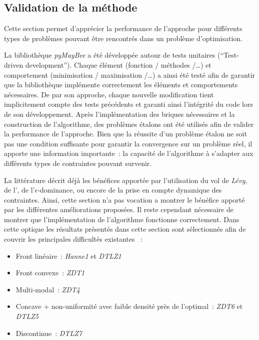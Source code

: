 \subsection{Validation de la méthode} %
\label{sub:validation_de_la_methode}
Cette section permet d’apprécier la performance de l’approche pour différents types
de problèmes pouvant être rencontrés dans un problème d’optimisation.

La bibliothèque \textit{pyMayBee} a été développée autour de tests unitaires (\enquote
{Test-driven development}). Chaque élément (fonction / méthodes /\dots) et comportement
(minimisation / maximisation /\dots) a ainsi été testé afin de garantir que la
bibliothèque implémente correctement les éléments et comportements nécessaires. De par
son approche, chaque nouvelle modification tient implicitement compte des tests précédents
et garanti ainsi l’intégrité du code lors de son développement. Après l’implémentation
des briques nécessaires et la construction de l’algorithme, des problèmes étalons ont été
utilisés afin de valider la performance de l’approche. Bien que la réussite d’un problème
étalon ne soit pas une condition suffisante pour garantir la convergence sur un problème
réel, il apporte une information importante~: la capacité de l’algorithme à s’adapter aux
différents types de contraintes pouvant survenir.

La littérature décrit déjà les bénéfices apportée par l’utilisation du vol de
\textit{Lévy}, de l’, de l’$\epsilon$-dominance, ou encore de la prise en compte
dynamique des contraintes. Ainsi, cette section n’a pas vocation a montrer le bénéfice
apporté par les différentes améliorations proposées. Il reste cependant nécessaire de
montrer que l’implémentation de l’algorithme  fonctionne correctement. Dans cette
optique les résultats présentés dans cette section sont sélectionnés afin de couvrir les
principales difficultés existantes \parencite{Collette2002,Deb2002825}~:
\begin{itemize}
    \item Front linéaire~: \textit{Hanne1} et \textit{DTLZ1}
    \item Front convexe~: \textit{ZDT1}
    \item Multi-modal~: \textit{ZDT4}
    \item Concave + non-uniformité avec faible densité près de l’optimal~: \textit{ZDT6} et \textit{DTLZ5}
    \item Discontinue~: \textit{DTLZ7}
\end{itemize}

